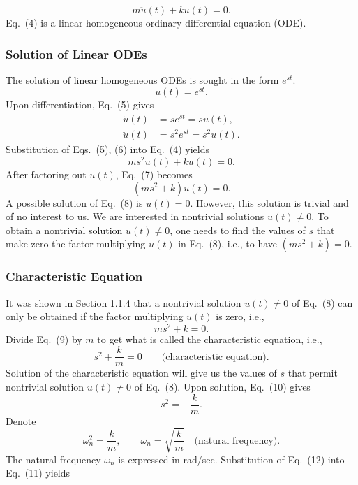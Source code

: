 \begin{equation}
    m\ddot{u}(t)+k u(t)=0.
    \tag{4}
\end{equation}
Eq.~(4) is a linear homogeneous ordinary differential equation (ODE).

\subsubsection{Solution of Linear ODEs}
The solution of linear homogeneous ODEs is sought in the form $e^{st}$.
\begin{equation}
    u(t)=e^{st}.
    \tag{5}
\end{equation}
Upon differentiation, Eq.~(5) gives
\begin{equation}
    \begin{aligned}
        \dot{u}(t)&=s e^{st}=s u(t),\\
        \ddot{u}(t)&=s^2 e^{st}=s^2 u(t).
    \end{aligned}
    \tag{6}
\end{equation}
Substitution of Eqs.~(5), (6) into Eq.~(4) yields
\begin{equation}
    m s^2 u(t)+k u(t)=0.
    \tag{7}
\end{equation}
After factoring out $u(t)$, Eq.~(7) becomes
\begin{equation}
    (m s^2+k)u(t)=0.
    \tag{8}
\end{equation}
A possible solution of Eq.~(8) is $u(t)=0$. However, this solution is trivial and of no interest to us. We are interested in nontrivial solutions $u(t)\ne0$. To obtain a nontrivial solution $u(t)\ne0$, one needs to find the values of $s$ that make zero the factor multiplying $u(t)$ in Eq.~(8), i.e., to have $(m s^2+k)=0$.

\subsubsection{Characteristic Equation}
It was shown in Section 1.1.4 that a nontrivial solution $u(t)\ne0$ of Eq.~(8) can only be obtained if the factor multiplying $u(t)$ is zero, i.e.,
\begin{equation}
    m s^2+k=0.
    \tag{9}
\end{equation}
Divide Eq.~(9) by $m$ to get what is called the characteristic equation, i.e.,
\begin{equation}
    s^2+\frac{k}{m}=0 \qquad \text{(characteristic equation)}.
    \tag{10}
\end{equation}
Solution of the characteristic equation will give us the values of $s$ that permit nontrivial solution $u(t)\ne0$ of Eq.~(8). Upon solution, Eq.~(10) gives
\begin{equation}
    s^2=-\frac{k}{m}.
    \tag{11}
\end{equation}
Denote
\begin{equation}
    \omega_n^2=\frac{k}{m}, \qquad \omega_n=\sqrt{\frac{k}{m}} \quad \text{(natural frequency)}.
    \tag{12}
\end{equation}
The natural frequency $\omega_n$ is expressed in rad/sec. Substitution of Eq.~(12) into Eq.~(11) yields
